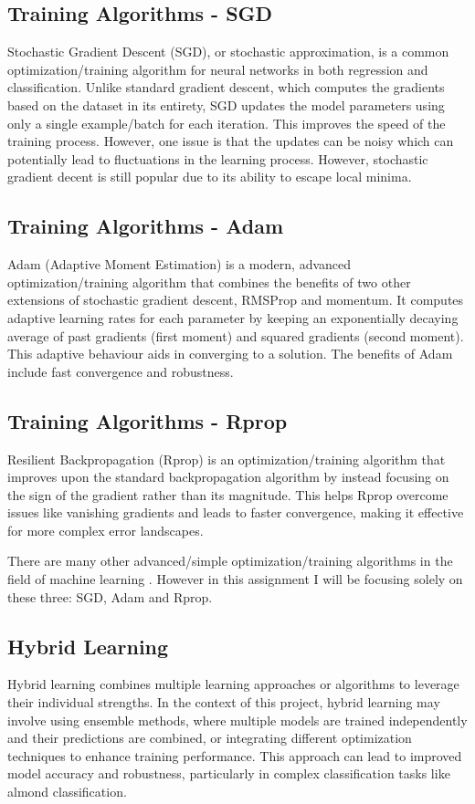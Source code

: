 \documentclass[conference]{IEEEtran}
\begin{document}
\subsection{Training Algorithms - SGD}
Stochastic Gradient Descent (SGD), or stochastic approximation, is a common optimization/training algorithm for neural networks \cite{zhou2021convergence} in both regression and classification. Unlike standard gradient descent, which computes the gradients based on the dataset in its entirety, SGD updates the model parameters using only a single example/batch for each iteration. This improves the speed of the training process. However, one issue is that the updates can be noisy which can potentially lead to fluctuations in the learning process. However, stochastic gradient decent is still popular due to its ability to escape local minima.

\subsection{Training Algorithms - Adam}
Adam (Adaptive Moment Estimation) is a modern, advanced optimization/training algorithm that combines the benefits of two other extensions of stochastic gradient descent, RMSProp and momentum. It computes adaptive learning rates for each parameter by keeping an exponentially decaying average of past gradients (first moment) and squared gradients (second moment). This adaptive behaviour aids in converging to a solution. The benefits of Adam include fast convergence and robustness.

\subsection{Training Algorithms - Rprop}
Resilient Backpropagation (Rprop) is an optimization/training algorithm that improves upon the standard backpropagation algorithm  by instead focusing on the sign of the gradient rather than its magnitude. This helps Rprop overcome issues like vanishing gradients and leads to faster convergence, making it effective for  more complex error landscapes.

There are many other advanced/simple optimization/training algorithms in the field of machine learning \cite{math11112466}. However in this assignment I will  be focusing solely on these three: SGD, Adam and Rprop.

\subsection{Hybrid Learning}
Hybrid learning combines multiple learning approaches or algorithms to leverage their individual strengths. In the context of this project, hybrid learning may involve using ensemble methods, where multiple models are trained independently and their predictions are combined, or integrating different optimization techniques to enhance training performance. This approach can lead to improved model accuracy and robustness, particularly in complex classification tasks like almond classification.
\end{document}
